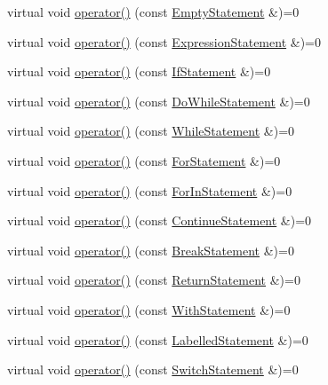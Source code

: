 \begin{DoxyCompactItemize}
\item 
virtual void \hyperlink{struct_visitor_a67719a8d9005a86141e4cb9226c11ca4}{operator()} (const \hyperlink{struct_empty_statement}{Empty\+Statement} \&)=0
\item 
virtual void \hyperlink{struct_visitor_a319554fbb3f24e664a86ef7839201040}{operator()} (const \hyperlink{struct_expression_statement}{Expression\+Statement} \&)=0
\item 
virtual void \hyperlink{struct_visitor_a9d30bc5ad73a274f7533df4b5a65ae41}{operator()} (const \hyperlink{struct_if_statement}{If\+Statement} \&)=0
\item 
virtual void \hyperlink{struct_visitor_a077a0025430c4b35d310bdfcbe1b180a}{operator()} (const \hyperlink{struct_do_while_statement}{Do\+While\+Statement} \&)=0
\item 
virtual void \hyperlink{struct_visitor_a4faef50c61a3c1246589390d925c2f53}{operator()} (const \hyperlink{struct_while_statement}{While\+Statement} \&)=0
\item 
virtual void \hyperlink{struct_visitor_a75180858faf5152f99742e4a19757928}{operator()} (const \hyperlink{struct_for_statement}{For\+Statement} \&)=0
\item 
virtual void \hyperlink{struct_visitor_af1c6c55ccfae8b2741e12168d81c45cb}{operator()} (const \hyperlink{struct_for_in_statement}{For\+In\+Statement} \&)=0
\item 
virtual void \hyperlink{struct_visitor_aca30136319d28baf708663a1d823af3a}{operator()} (const \hyperlink{struct_continue_statement}{Continue\+Statement} \&)=0
\item 
virtual void \hyperlink{struct_visitor_a19997436906171d41bec562d9cf260ef}{operator()} (const \hyperlink{struct_break_statement}{Break\+Statement} \&)=0
\item 
virtual void \hyperlink{struct_visitor_a041431785a00f9f387c7bc670b3ac660}{operator()} (const \hyperlink{struct_return_statement}{Return\+Statement} \&)=0
\item 
virtual void \hyperlink{struct_visitor_a16b17bbc1c01ed7ce1a0153b5c4c43a6}{operator()} (const \hyperlink{struct_with_statement}{With\+Statement} \&)=0
\item 
virtual void \hyperlink{struct_visitor_aea8fafb476b979172cc8a76ae511caff}{operator()} (const \hyperlink{struct_labelled_statement}{Labelled\+Statement} \&)=0
\item 
virtual void \hyperlink{struct_visitor_aadc852469aa4f7da11cc9f88084c63a8}{operator()} (const \hyperlink{struct_switch_statement}{Switch\+Statement} \&)=0

\end{DoxyCompactItemize}
